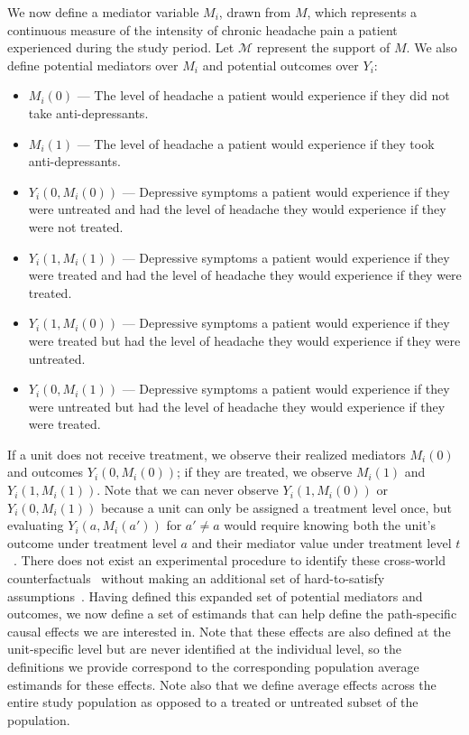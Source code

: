 We now define a mediator variable $M_{i}$, drawn from $M$, which represents a continuous measure of the
intensity of chronic
headache pain a patient experienced during the study period. Let $\mathcal{M}$ represent the support of $M$.
We also define potential mediators over $M_{i}$ and potential outcomes over $Y_{i}$:
\begin{itemize}[noitemsep,topsep=0pt]
	\item $M_{i}(0)$ --- The level of headache a patient would experience if they did not take anti-depressants.
	\item $M_{i}(1)$ --- The level of headache a patient would experience if they took anti-depressants.
	\item $Y_{i}(0,M_{i}(0))$ --- Depressive symptoms a patient would experience if they were untreated and had 
	the level of headache they would experience if they were not treated. 
	\item $Y_{i}(1,M_{i}(1))$ --- Depressive symptoms a patient would experience if they were treated and had 
	the level of headache they would experience if they were treated. 
	\item $Y_{i}(1,M_{i}(0))$ --- Depressive symptoms a patient would experience if they were treated but had 
	the level of headache they would experience if they were untreated.
	\item $Y_{i}(0,M_{i}(1))$ --- Depressive symptoms a patient would experience if they were untreated but had 
	the level of headache they would experience if they were treated.
\end{itemize}

If a unit does not receive treatment, we observe their realized mediators $M_{i}(0)$ and outcomes $Y_{i}(0,M_{i}(0))$;
if they are treated, we observe $M_{i}(1)$ and $Y_{i}(1,M_{i}(1))$. Note that we can never observe $Y_{i}(1,M_{i}(0))$ or
$Y_{i}(0,M_{i}(1))$ because a unit can only be assigned a treatment level once, but evaluating $Y_{i}(a,M_{i}(a'))$ for 
$a' \neq a$ would require knowing both the unit's outcome under treatment level $a$ and their mediator value under
treatment level $t$~\citep{robinsgreenland1992}. There does not exist an experimental procedure to identify 
these cross-world counterfactuals~\citep{pearl2001} without making an additional set of hard-to-satisfy 
assumptions~\citep{imaietal2013}. Having defined this expanded set of potential mediators and outcomes, we
now define a set of estimands that can help define the path-specific causal effects we are interested in. Note that 
these effects are also defined at the unit-specific level but are never identified at the individual level, so the 
definitions we provide correspond to the corresponding population average estimands for these effects. Note also that
we define average effects across the entire study population as opposed to a treated or untreated subset of the 
population. 

